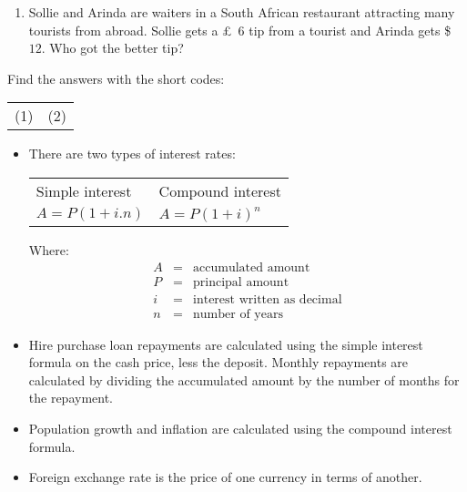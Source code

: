 \begin{exercises}{}
{\begin{enumerate}[itemsep=6pt, label=\textbf{\arabic*}.]
\begin{enumerate}[noitemsep, label=\textbf{(\alph*)} ]
	    \item Sollie and Arinda are waiters in a South African restaurant attracting many tourists from abroad. Sollie gets a £~$6$ tip from a tourist and Arinda gets \$~$12$. Who got the better tip?
	\end{enumerate}
    \end{enumerate}
\practiceinfo
    Find the answers with the short codes:\\
    \begin{tabularx}{\textwidth}{ XX }
	(1)	&	(2)\\
    \end{tabularx}
}
\end{exercises}



\begin{itemize}
    \item There are two types of interest rates:\\
    
    \begin{tabularx}{\textwidth}{ XX }
	Simple	interest &	Compound interest\\
	$A = P (1 + i . n)$	&	$A = P(1 + i)^n$\\
    \end{tabularx}
    \par
    Where:
    \begin{eqnarray*}
	A &=& \text{accumulated amount}\\
	P &=& \text{principal amount}\\
	i &=& \text{interest written as decimal}\\
	n &=& \text{number of years}
    \end{eqnarray*}

    \item Hire purchase loan repayments are calculated using the simple interest formula on the cash price, less the deposit.  Monthly repayments are calculated by dividing the accumulated amount by the number of months for the repayment.

    \item Population growth and inflation are calculated using the compound interest formula.

    \item Foreign exchange rate is the price of one currency in terms of another.
\end{itemize}


